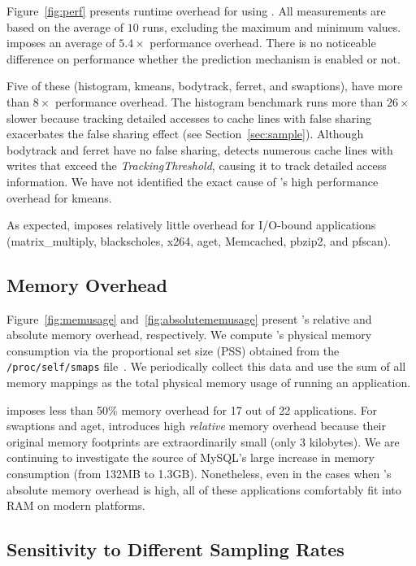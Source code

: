 Figure~\ref{fig:perf} presents runtime overhead for using \Predator{}. All 
measurements are based on the average of $10$ runs, excluding the maximum and minimum values. \Predator{} imposes an average of $5.4\times$ performance overhead. There is no noticeable difference on performance whether the prediction mechanism is enabled or not. 
 
Five of these (histogram, kmeans, bodytrack, ferret, and swaptions), have more than $8\times$ performance overhead. The histogram benchmark runs more than $26\times$ slower because tracking detailed accesses to cache lines with false sharing exacerbates the false sharing effect (see Section~\ref{sec:sample}). Although bodytrack and ferret have no false sharing, \Predator{} detects numerous cache lines with writes that exceed the {\it TrackingThreshold}, causing it to track detailed access information. We have not identified the exact cause of \Predator{}'s high performance overhead for kmeans.
   
As expected, \Predator{} imposes relatively little overhead for I/O-bound applications (matrix\_multiply, blackscholes, x264, aget, Memcached, pbzip2, and pfscan).

\subsection{Memory Overhead}
\label{sec:memoverhead}

Figure~\ref{fig:memusage} and~\ref{fig:absolutememusage} present \Predator{}'s relative and absolute memory overhead, respectively. We compute \Predator{}'s physical memory consumption via the proportional set size (PSS) obtained from the \texttt{/proc/self/smaps} file~\cite{memusage}. We periodically collect this data and use the sum of all memory mappings as the total physical memory usage of running an application.

\Predator{} imposes less than 50\% memory overhead for 17 out of 22 applications.  For swaptions and aget, \Predator{} introduces high \emph{relative} memory overhead because their original memory footprints are extraordinarily small (only $3$ kilobytes). We are continuing to investigate the source of MySQL's large increase in memory consumption (from 132MB to 1.3GB). Nonetheless, even in the cases when \Predator{}'s absolute memory overhead is high, all of these applications comfortably fit into RAM on modern platforms.

\subsection{Sensitivity to Different Sampling Rates}
\label{sec:sensitivity}

